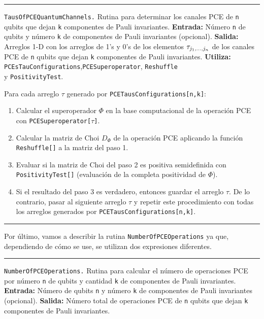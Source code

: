 \noindent\rule{\textwidth}{1mm}
\texttt{TausOfPCEQuantumChannels.} Rutina para determinar los 
canales PCE de \texttt{n} qubits que dejan \texttt{k} componentes de Pauli
invariantes. \newline
\textbf{Entrada:} Número \texttt{n} de 
qubits y número \texttt{k} de componentes de Pauli invariantes (opcional). \newline
\textbf{Salida:} Arreglos 1-D con los 
arreglos de 1's y 0's de los elementos $\tau_{j_1,\ldots ,j_n}$ de 
los canales PCE de \texttt{n} qubits que dejan \texttt{k} componentes de Pauli 
invariantes.  \newline
\textbf{Utiliza:} \texttt{PCEsTauConfigurations},\texttt{PCESuperoperator}, 
\texttt{Reshuffle}\\ y \texttt{PositivityTest}. \par

Para cada arreglo $\tau$ generado por 
\texttt{PCETausConfigurations[n,k]}:
\begin{enumerate}
	\item Calcular el superoperador $\Phi$ en la base computacional
	de la operación PCE con \texttt{PCESuperoperator[$\tau$]}.
	\item Calcular la matriz de Choi $D_{\Phi}$ de la operación PCE 
	aplicando la función \texttt{Reshuffle[]} a la matriz del paso 1.
	\item Evaluar si la matriz de Choi del paso 2 es positiva semidefinida con\\
	\texttt{PositivityTest[]} (evaluación de la completa positividad 
	de $\Phi$).
	\item Si el resultado del paso 3 es verdadero, entonces guardar 
	el arreglo $\tau$. De lo contrario, pasar al siguiente 
	arreglo $\tau$ y repetir este procedimiento con todas 
	los arreglos generados por \texttt{PCETausConfigurations[n,k]}. 
\end{enumerate} \vspace{-.5cm}
\noindent\rule{\textwidth}{1mm}

Por último, vamos a describir la rutina \texttt{NumberOfPCEOperations}
ya que, dependiendo de cómo se use, se utilizan dos expresiones 
diferentes. 

\noindent\rule{\textwidth}{1mm}
\texttt{NumberOfPCEOperations.} Rutina para calcular el número de 
operaciones PCE por número \texttt{n} de qubits y cantidad \texttt{k} de componentes
de Pauli invariantes.\newline
\textbf{Entrada:} Número de qubits \texttt{n} y número \texttt{k} 
de componentes de Pauli invariantes (opcional). \newline
\textbf{Salida:} Número total de operaciones PCE de \texttt{n} qubits 
que dejan \texttt{k} componentes de Pauli invariantes.\par 

